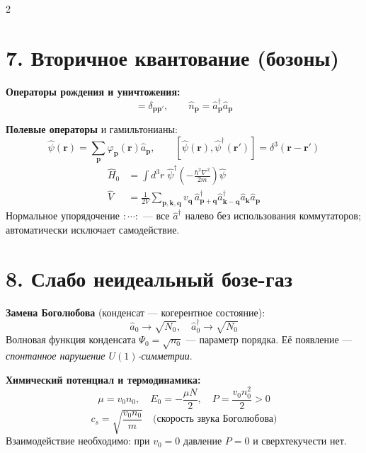 \documentclass[a4paper,10pt]{article}
\begin{document}
\begin{multicols}{2}
\section*{7. Вторичное квантование (бозоны)}

\textbf{Операторы рождения и уничтожения:}
\begin{equation*}
    [\hat{a}_\mathbf{p},\,\hat{a}^\dagger_{\mathbf{p}'}] = \delta_{\mathbf{p}\mathbf{p}'}, \qquad
    \hat{n}_\mathbf{p} = \hat{a}^\dagger_\mathbf{p}\hat{a}_\mathbf{p}
\end{equation*}

\textbf{Полевые операторы} и гамильтонианы:
\begin{equation*}
    \hat{\psi}(\mathbf{r}) = \sum_\mathbf{p}\varphi_\mathbf{p}(\mathbf{r})\hat{a}_\mathbf{p}, \qquad
    [\hat{\psi}(\mathbf{r}),\hat{\psi}^\dagger(\mathbf{r}')] = \delta^3(\mathbf{r}-\mathbf{r}')
\end{equation*}
\begin{align*}
    \hat{H}_0 &= \int\! d^3r\;\hat{\psi}^\dagger\!\left(-\tfrac{\hbar^2\nabla^2}{2m}\right)\hat{\psi} \\
    \hat{V} &= \frac{1}{2V}\sum_{\mathbf{p},\mathbf{k},\mathbf{q}} v_\mathbf{q}\,\hat{a}^\dagger_{\mathbf{p}+\mathbf{q}}\hat{a}^\dagger_{\mathbf{k}-\mathbf{q}}\hat{a}_\mathbf{k}\hat{a}_\mathbf{p}
\end{align*}
Нормальное упорядочение $:\cdots:$ --- все $\hat{a}^\dagger$ налево без использования коммутаторов; автоматически исключает самодействие.

\section*{8. Слабо неидеальный бозе-газ}

\textbf{Замена Боголюбова} (конденсат --- когерентное состояние):
\begin{equation*}
    \hat{a}_0 \to \sqrt{N_0}, \quad \hat{a}^\dagger_0 \to \sqrt{N_0}
\end{equation*}
Волновая функция конденсата $\Psi_0 = \sqrt{n_0}$ --- параметр порядка. Её появление --- \emph{спонтанное нарушение $U(1)$-симметрии}.

\textbf{Химический потенциал и термодинамика:}
\begin{equation*}
    \mu = v_0 n_0, \quad E_0 = -\frac{\mu N}{2}, \quad P = \frac{v_0 n_0^2}{2} > 0
\end{equation*}
\begin{equation*}
    c_s = \sqrt{\frac{v_0 n_0}{m}} \quad \text{(скорость звука Боголюбова)}
\end{equation*}
Взаимодействие необходимо: при $v_0 = 0$ давление $P = 0$ и сверхтекучести нет.


\end{multicols}
\end{document}
